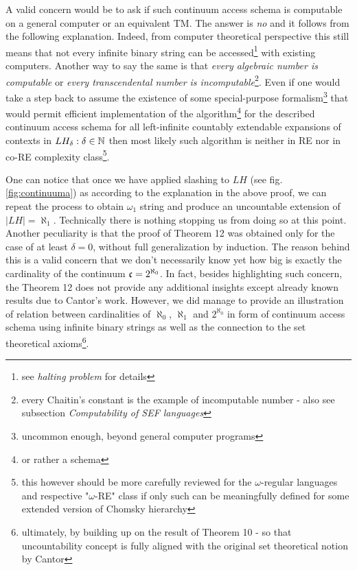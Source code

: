 A valid concern would be to ask if such continuum access schema is computable on a general computer or an equivalent TM. The answer is \textit{no} and it follows from the following explanation. Indeed, from computer theoretical perspective this still means that not every infinite binary string can be accessed\footnote{see \textit{halting problem} for details} with existing computers. Another way to say the same is that \textit{every algebraic number is computable} or \textit{every transcendental number is incomputable}\footnote{every Chaitin's constant is the example of incomputable number - also see subsection \textit{Computability of SEF languages}}. Even if one would take a step back to assume the existence of some special-purpose formalism\footnote{uncommon enough, beyond general computer programs} that would permit efficient implementation of the algorithm\footnote{or rather a schema} for the described continuum access schema for all left-infinite countably extendable expansions of contexts in $LH_\delta: \delta \in \mathbb{N}$ then most likely such algorithm is neither in RE nor in co-RE complexity class\footnote{this however should be more carefully reviewed for the $\omega$-regular languages and respective "$\omega$-RE" class if only such can be meaningfully defined for some extended version of Chomsky hierarchy}.

One can notice that once we have applied slashing to $LH$ (see fig.\ref{fig:continuuma}) as according to the explanation in the above proof, we can repeat the process to obtain $\omega_1$ string and produce an uncountable extension of $|LH| = \aleph_1$. Technically there is nothing stopping us from doing so at this point. Another peculiarity is that the proof of Theorem 12 was obtained only for the case of at least $\delta = 0$, without full generalization by induction. The reason behind this is a valid concern that we don't necessarily know yet how big is exactly the cardinality of the continuum $\mathfrak{c} = 2^{\aleph_0}$. In fact, besides highlighting such concern, the Theorem 12 does not provide any additional insights except already known results due to Cantor's work\cite{cantor1915contributions, kanamori1996mathematical, goldrei1996classic}. However, we did manage to provide an illustration of relation between cardinalities of $\aleph_0$, $\aleph_1$ and $2^{\aleph_0}$ in form of continuum access schema using infinite binary strings as well as the connection to the set theoretical axioms\footnote{ultimately, by building up on the result of Theorem 10 - so that uncountability concept is fully aligned with the original set theoretical notion by Cantor}.

